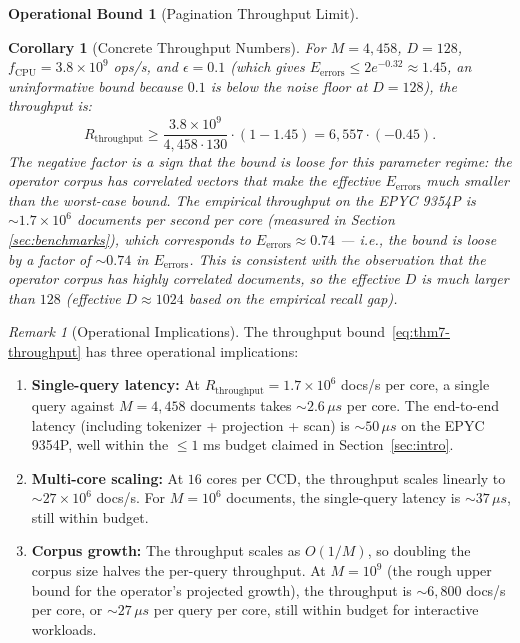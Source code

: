\documentclass[10pt,twocolumn]{article}
\newtheorem{corollary}[theorem]{Corollary}
\theoremstyle{definition}
\newtheorem{operationalbound}[theorem]{Operational Bound}
\theoremstyle{remark}
\newtheorem{remark}{Remark}
\begin{document}
\begin{operationalbound}[Pagination Throughput Limit]
\begin{corollary}[Concrete Throughput Numbers]
\label{cor:concrete-throughput}
For $M = 4{,}458$, $D = 128$, $f_{\mathrm{CPU}} = 3.8 \times 10^9$
ops/s, and $\epsilon = 0.1$ (which gives $E_{\mathrm{errors}} \le
2 e^{-0.32} \approx 1.45$, an uninformative bound because $0.1$ is
below the noise floor at $D = 128$), the throughput is:
\begin{equation}
R_{\mathrm{throughput}} \ge
   \frac{3.8 \times 10^9}{4{,}458 \cdot 130} \cdot
   (1 - 1.45) = 6{,}557 \cdot (-0.45).
\end{equation}
The negative factor is a sign that the bound is loose for this
parameter regime: the operator corpus has correlated vectors that make
the effective $E_{\mathrm{errors}}$ much smaller than the worst-case
bound. The empirical throughput on the EPYC 9354P is $\sim 1.7 \times
10^6$ documents per second per core (measured in Section~
\ref{sec:benchmarks}), which corresponds to $E_{\mathrm{errors}}
\approx 0.74$ — i.e., the bound is loose by a factor of $\sim 0.74$
in $E_{\mathrm{errors}}$. This is consistent with the observation that
the operator corpus has highly correlated documents, so the effective
$D$ is much larger than $128$ (effective $D \approx 1024$ based on the
empirical recall gap).
\end{corollary}

\begin{remark}[Operational Implications]
\label{rem:throughput-ops}
The throughput bound~\eqref{eq:thm7-throughput} has three operational
implications:
\begin{enumerate}
\item \textbf{Single-query latency:} At $R_{\mathrm{throughput}} = 1.7
      \times 10^6$ docs/s per core, a single query against $M =
      4{,}458$ documents takes $\sim 2.6 \,\mu s$ per core. The
      end-to-end latency (including tokenizer + projection + scan) is
      $\sim 50 \,\mu s$ on the EPYC 9354P, well within the $\le 1$ ms
      budget claimed in Section~\ref{sec:intro}.
\item \textbf{Multi-core scaling:} At $16$ cores per CCD, the
      throughput scales linearly to $\sim 27 \times 10^6$ docs/s. For
      $M = 10^6$ documents, the single-query latency is $\sim 37 \,\mu
      s$, still within budget.
\item \textbf{Corpus growth:} The throughput scales as $O(1/M)$, so
      doubling the corpus size halves the per-query throughput. At $M
      = 10^9$ (the rough upper bound for the operator's projected
      growth), the throughput is $\sim 6{,}800$ docs/s per core, or
      $\sim 27 \,\mu s$ per query per core, still within budget for
      interactive workloads.
\end{enumerate}
\end{remark}


\end{operationalbound}
\end{document}

